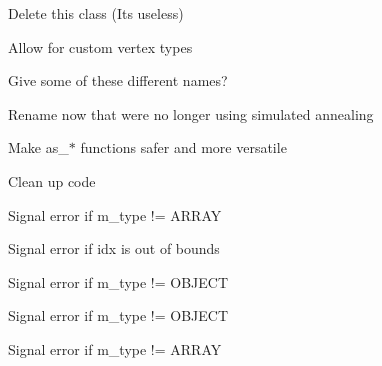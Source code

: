 \begin{DoxyRefList}
\item[\label{todo__todo000010}%
\Hypertarget{todo__todo000010}%
Class \hyperlink{classnta_1_1Sprite}{nta\+:\+:Sprite} ]Delete this class (It\textquotesingle{}s useless)  
\item[\label{todo__todo000011}%
\Hypertarget{todo__todo000011}%
Class \hyperlink{classnta_1_1SpriteBatch}{nta\+:\+:Sprite\+Batch} ]Allow for custom vertex types  
\item[\label{todo__todo000013}%
\Hypertarget{todo__todo000013}%
Member \hyperlink{classnta_1_1SpriteBatch_aa703fb92d0bd42865c21fdfb2625660d}{nta\+:\+:Sprite\+Batch\+:\+:add\+Glyph} (crvec4 pos\+Rect, crvec4 uv\+Rect, G\+Luint texture, float depth=N\+T\+A\+\_\+\+D\+E\+F\+A\+U\+L\+T\+\_\+\+D\+E\+P\+TH, crvec4 color=glm\+::vec4(1))]Give some of these different names?  
\item[\label{todo__todo000028}%
\Hypertarget{todo__todo000028}%
Member \hyperlink{classnta_1_1SpriteFont_a9dc96f31efd0830dcb476ea87534e358}{nta\+:\+:Sprite\+Font\+:\+:Sprite\+Font} (crstring font\+Path, unsigned int size)]Rename now that we\textquotesingle{}re no longer using simulated annealing  
\item[\label{todo__todo000006}%
\Hypertarget{todo__todo000006}%
Class \hyperlink{classnta_1_1utils_1_1Json}{nta\+:\+:utils\+:\+:Json} ]Make as\+\_\+$\ast$ functions safer and more versatile 
\item[\label{todo__todo000022}%
\Hypertarget{todo__todo000022}%
Member \hyperlink{classnta_1_1utils_1_1Json_ab0e60f7a55d12aab005d420c8f924035}{nta\+:\+:utils\+:\+:Json\+:\+:dump} (std\+::size\+\_\+t indent=0, std\+::size\+\_\+t offset=0) const]Clean up code  
\item[\label{todo__todo000020}%
\Hypertarget{todo__todo000020}%
Member \hyperlink{classnta_1_1utils_1_1Json_a893f191111e604995488d147aaa711f8}{nta\+:\+:utils\+:\+:Json\+:\+:operator\mbox{[}\mbox{]}} (std\+::size\+\_\+t idx) const]Signal error if m\+\_\+type != A\+R\+R\+AY 

Signal error if idx is out of bounds  
\item[\label{todo__todo000016}%
\Hypertarget{todo__todo000016}%
Member \hyperlink{classnta_1_1utils_1_1Json_adf2d340a2bf7d59c537e398a1be66cf7}{nta\+:\+:utils\+:\+:Json\+:\+:operator\mbox{[}\mbox{]}} (crstring key)]Signal error if m\+\_\+type != O\+B\+J\+E\+CT  
\item[\label{todo__todo000017}%
\Hypertarget{todo__todo000017}%
Member \hyperlink{classnta_1_1utils_1_1Json_ab3b51a07ebed90330c98fd8e20785781}{nta\+:\+:utils\+:\+:Json\+:\+:operator\mbox{[}\mbox{]}} (crstring key) const]Signal error if m\+\_\+type != O\+B\+J\+E\+CT  
\item[\label{todo__todo000018}%
\Hypertarget{todo__todo000018}%
Member \hyperlink{classnta_1_1utils_1_1Json_a236b5885612b74c21fbad169b21eaf55}{nta\+:\+:utils\+:\+:Json\+:\+:operator\mbox{[}\mbox{]}} (std\+::size\+\_\+t idx)]Signal error if m\+\_\+type != A\+R\+R\+AY 


\end{DoxyRefList}
